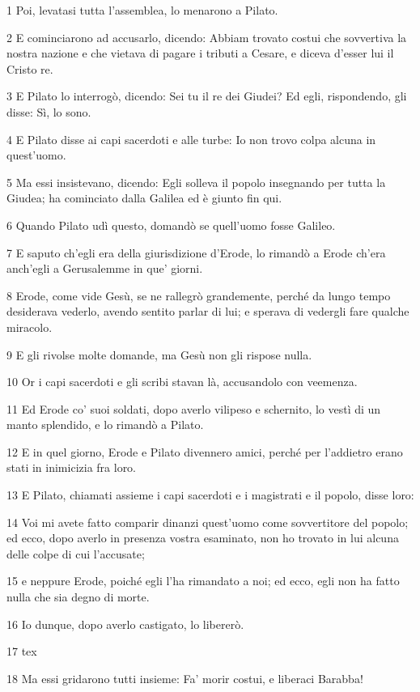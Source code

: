 \par 1 Poi, levatasi tutta l'assemblea, lo menarono a Pilato.
\par 2 E cominciarono ad accusarlo, dicendo: Abbiam trovato costui che sovvertiva la nostra nazione e che vietava di pagare i tributi a Cesare, e diceva d'esser lui il Cristo re.
\par 3 E Pilato lo interrogò, dicendo: Sei tu il re dei Giudei? Ed egli, rispondendo, gli disse: Sì, lo sono.
\par 4 E Pilato disse ai capi sacerdoti e alle turbe: Io non trovo colpa alcuna in quest'uomo.
\par 5 Ma essi insistevano, dicendo: Egli solleva il popolo insegnando per tutta la Giudea; ha cominciato dalla Galilea ed è giunto fin qui.
\par 6 Quando Pilato udì questo, domandò se quell'uomo fosse Galileo.
\par 7 E saputo ch'egli era della giurisdizione d'Erode, lo rimandò a Erode ch'era anch'egli a Gerusalemme in que' giorni.
\par 8 Erode, come vide Gesù, se ne rallegrò grandemente, perché da lungo tempo desiderava vederlo, avendo sentito parlar di lui; e sperava di vedergli fare qualche miracolo.
\par 9 E gli rivolse molte domande, ma Gesù non gli rispose nulla.
\par 10 Or i capi sacerdoti e gli scribi stavan là, accusandolo con veemenza.
\par 11 Ed Erode co' suoi soldati, dopo averlo vilipeso e schernito, lo vestì di un manto splendido, e lo rimandò a Pilato.
\par 12 E in quel giorno, Erode e Pilato divennero amici, perché per l'addietro erano stati in inimicizia fra loro.
\par 13 E Pilato, chiamati assieme i capi sacerdoti e i magistrati e il popolo, disse loro:
\par 14 Voi mi avete fatto comparir dinanzi quest'uomo come sovvertitore del popolo; ed ecco, dopo averlo in presenza vostra esaminato, non ho trovato in lui alcuna delle colpe di cui l'accusate;
\par 15 e neppure Erode, poiché egli l'ha rimandato a noi; ed ecco, egli non ha fatto nulla che sia degno di morte.
\par 16 Io dunque, dopo averlo castigato, lo libererò.
\par 17 tex
\par 18 Ma essi gridarono tutti insieme: Fa' morir costui, e liberaci Barabba!
